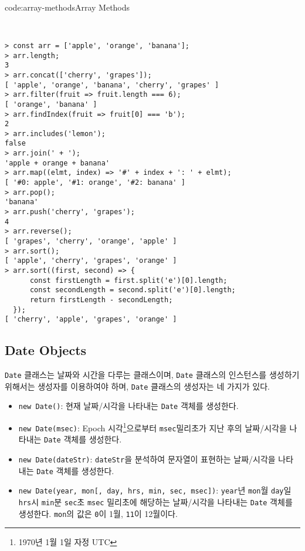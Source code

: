 \begin{codeenv}{code:array-methods}{Array Methods}\begin{verbatim}


> const arr = ['apple', 'orange', 'banana'];
> arr.length;
3
> arr.concat(['cherry', 'grapes']);
[ 'apple', 'orange', 'banana', 'cherry', 'grapes' ]
> arr.filter(fruit => fruit.length === 6);
[ 'orange', 'banana' ]
> arr.findIndex(fruit => fruit[0] === 'b');
2
> arr.includes('lemon');
false
> arr.join(' + ');
'apple + orange + banana'
> arr.map((elmt, index) => '#' + index + ': ' + elmt);
[ '#0: apple', '#1: orange', '#2: banana' ]
> arr.pop();
'banana'
> arr.push('cherry', 'grapes');
4
> arr.reverse();
[ 'grapes', 'cherry', 'orange', 'apple' ]
> arr.sort();
[ 'apple', 'cherry', 'grapes', 'orange' ]
> arr.sort((first, second) => {
      const firstLength = first.split('e')[0].length;
      const secondLength = second.split('e')[0].length;
      return firstLength - secondLength;
  });
[ 'cherry', 'apple', 'grapes', 'orange' ]
\end{verbatim}
\end{codeenv}
\newpage

\subsection*{Date Objects}

\texttt{Date} 클래스는 날짜와 시간을 다루는 클래스이며, \texttt{Date} 클래스의 인스턴스를 생성하기 위해서는 생성자를 이용하여야 하며, \texttt{Date} 클래스의 생성자는 네 가지가 있다.

\begin{itemize}
    \item \texttt{new Date()}: 현재 날짜/시각을 나타내는 \texttt{Date} 객체를 생성한다.
    \item \texttt{new Date(msec)}: Epoch 시각\footnote{1970년 1월 1일 자정 UTC}으로부터 \texttt{msec}밀리초가 지난 후의 날짜/시각을 나타내는 \texttt{Date} 객체를 생성한다.
    \item \texttt{new Date(dateStr)}: \texttt{dateStr}을 분석하여 문자열이 표현하는 날짜/시각을 나타내는 \texttt{Date} 객체를 생성한다.
    \item \texttt{new Date(year, mon[, day, hrs, min, sec, msec])}: \texttt{year}년 \texttt{mon}월 \texttt{day}일 \texttt{hrs}시 \texttt{min}분 \texttt{sec}초 \texttt{msec} 밀리초에 해당하는 날짜/시각을 나타내는 \texttt{Date} 객체를 생성한다. \texttt{mon}의 값은 \texttt{0}이 1월, \texttt{11}이 12월이다.
\end{itemize}

